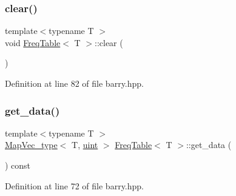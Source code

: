 \mbox{\label{classbarry_1_1_freq_table_a326660096e4309780aea8355d0f74ac7}} 
\subsubsection{\texorpdfstring{clear()}{clear()}}
{\footnotesize\ttfamily template$<$typename T $>$ \\
void \hyperlink{classbarry_1_1_freq_table}{Freq\+Table}$<$ T $>$\+::clear (\begin{DoxyParamCaption}{ }\end{DoxyParamCaption})\hspace{0.3cm}{\ttfamily [inline]}}



Definition at line 82 of file barry.\+hpp.

\mbox{\label{classbarry_1_1_freq_table_a7b99496d1c2f4193654752856b30d1a5}} 
\subsubsection{\texorpdfstring{get\+\_\+data()}{get\_data()}}
{\footnotesize\ttfamily template$<$typename T $>$ \\
\hyperlink{namespacebarry_a2f0d3aab1d67e4c8eaeab9022e16139f}{Map\+Vec\+\_\+type}$<$ T, \hyperlink{namespacebarry_a11dfc53ddb4672278319aa04f1e09a6c}{uint} $>$ \hyperlink{classbarry_1_1_freq_table}{Freq\+Table}$<$ T $>$\+::get\+\_\+data (\begin{DoxyParamCaption}{ }\end{DoxyParamCaption}) const\hspace{0.3cm}{\ttfamily [inline]}}



Definition at line 72 of file barry.\+hpp.

\mbox{\label{classbarry_1_1_freq_table_ab5dd6677f52072c93d18b2b9a3369ae7}} 

